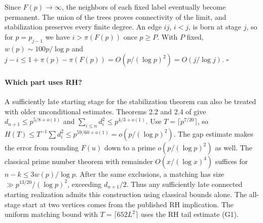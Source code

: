 Since $F(p)\to\infty$, the neighbors of each fixed label eventually
become permanent. The union of the trees proves connectivity of the
limit, and stabilization preserves every finite degree. An edge $ij$,
$i<j$, is born at stage $j$, so for $p=p_{j-1}$ we have
$i>\pi(F(p))$ once $p\ge P$. With $P$ fixed,
$w(p)\sim100p/\log p$ and
$j-i\le1+\pi(p)-\pi(F(p))=O(p/(\log p)^2)=O(j/\log j)$.
\hfill$\square$

\paragraph{Which part uses RH?}
A sufficiently late starting stage for the stabilization theorem can
also be treated with older unconditional estimates. Theorems 2.2 and
2.4 of \cite{graphEH} give $d_{n+1}\le p^{5/8+o(1)}$ and
$\sum_{i\le n}d_i^2\le p^{4/3+o(1)}$. Use
$T=\lceil p^{7/20}\rceil$, so
$H(T)\le T^{-1}\sum d_i^2\le p^{59/60+o(1)}=o(p/(\log p)^2)$.
The gap estimate makes the error from rounding $F(u)$ down to a prime
$o(p/(\log p)^2)$ as well. The classical prime number theorem with
remainder $O(x/(\log x)^4)$ suffices for $n-k\le3w(p)/\log p$.
After the same exclusions, a matching has size
$\gg p^{13/20}/(\log p)^2$, exceeding $d_{n+1}/2$.
Thus any sufficiently late connected starting realization admits this
construction using classical bounds alone. The all-stage start at two
vertices comes from the published RH implication. The uniform matching
bound with $T=\lceil652L^2\rceil$ uses the RH tail estimate (G1).
